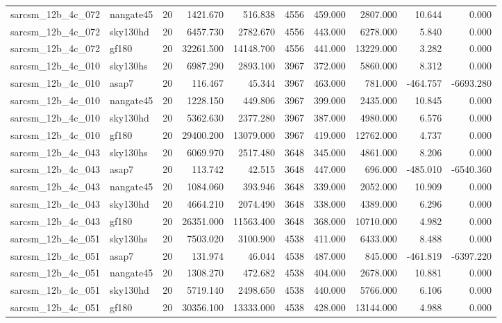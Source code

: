 \documentclass{article}
\begin{document}
\begin{longtable}{llrrrrrrrr}
sarcsm\_12b\_4c\_072 & nangate45 & 20 & 1421.670 & 516.838 & 4556 & 459.000 & 2807.000 & 10.644 & 0.000 \\
sarcsm\_12b\_4c\_072 & sky130hd & 20 & 6457.730 & 2782.670 & 4556 & 443.000 & 6278.000 & 5.840 & 0.000 \\
sarcsm\_12b\_4c\_072 & gf180 & 20 & 32261.500 & 14148.700 & 4556 & 441.000 & 13229.000 & 3.282 & 0.000 \\
sarcsm\_12b\_4c\_010 & sky130hs & 20 & 6987.290 & 2893.100 & 3967 & 372.000 & 5860.000 & 8.312 & 0.000 \\
sarcsm\_12b\_4c\_010 & asap7 & 20 & 116.467 & 45.344 & 3967 & 463.000 & 781.000 & -464.757 & -6693.280 \\
sarcsm\_12b\_4c\_010 & nangate45 & 20 & 1228.150 & 449.806 & 3967 & 399.000 & 2435.000 & 10.845 & 0.000 \\
sarcsm\_12b\_4c\_010 & sky130hd & 20 & 5362.630 & 2377.280 & 3967 & 387.000 & 4980.000 & 6.576 & 0.000 \\
sarcsm\_12b\_4c\_010 & gf180 & 20 & 29400.200 & 13079.000 & 3967 & 419.000 & 12762.000 & 4.737 & 0.000 \\
sarcsm\_12b\_4c\_043 & sky130hs & 20 & 6069.970 & 2517.480 & 3648 & 345.000 & 4861.000 & 8.206 & 0.000 \\
sarcsm\_12b\_4c\_043 & asap7 & 20 & 113.742 & 42.515 & 3648 & 447.000 & 696.000 & -485.010 & -6540.360 \\
sarcsm\_12b\_4c\_043 & nangate45 & 20 & 1084.060 & 393.946 & 3648 & 339.000 & 2052.000 & 10.909 & 0.000 \\
sarcsm\_12b\_4c\_043 & sky130hd & 20 & 4664.210 & 2074.490 & 3648 & 338.000 & 4389.000 & 6.296 & 0.000 \\
sarcsm\_12b\_4c\_043 & gf180 & 20 & 26351.000 & 11563.400 & 3648 & 368.000 & 10710.000 & 4.982 & 0.000 \\
sarcsm\_12b\_4c\_051 & sky130hs & 20 & 7503.020 & 3100.900 & 4538 & 411.000 & 6433.000 & 8.488 & 0.000 \\
sarcsm\_12b\_4c\_051 & asap7 & 20 & 131.974 & 46.044 & 4538 & 487.000 & 845.000 & -461.819 & -6397.220 \\
sarcsm\_12b\_4c\_051 & nangate45 & 20 & 1308.270 & 472.682 & 4538 & 404.000 & 2678.000 & 10.881 & 0.000 \\
sarcsm\_12b\_4c\_051 & sky130hd & 20 & 5719.140 & 2498.650 & 4538 & 440.000 & 5766.000 & 6.106 & 0.000 \\
sarcsm\_12b\_4c\_051 & gf180 & 20 & 30356.100 & 13333.000 & 4538 & 428.000 & 13144.000 & 4.988 & 0.000 \\

\end{longtable}
\end{document}
